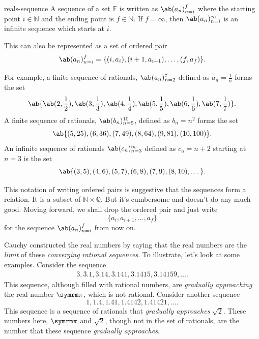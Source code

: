 \begin{notation}{}{reals-sequence}
  A sequence of a set $\mathbb{F}$ is written as $\sequence{a_n}{n = i}{f}$ where the
  starting point $i \in \mathbb{N}$ and the ending point is $f \in \mathbb{N}$. If
  $f = \infty$, then $\sequence{a_n}{n = i}{\infty}$ is an infinite sequence which starts at $i$.

  This can also be represented as a set of ordered pair
  \begin{equation}
    \sequence{a_n}{n = i}{f} = \{(i, a_i), (i + 1, a_{i+1}), \dots, (f, a_{f})\}.
  \end{equation}
\end{notation}

For example, a finite sequence of rationals, $\sequence{a_n}{n = 2}{7}$ defined as
$a_n = \frac{1}{n}$ forms the set
\begin{equation*}
  \ab\{\ab(2, \frac{1}{2}), \ab(3, \frac{1}{3}), \ab(4, \frac{1}{4}), \ab(5, \frac{1}{5}), \ab(6, \frac{1}{6}), \ab(7, \frac{1}{7})\}.
\end{equation*}
A finite sequence of rationals, $\sequence{b_n}{n = 5}{10}$, defined as $b_n = n^2$ forms the set
\begin{equation*}
  \ab\{(5, 25), (6, 36), (7, 49), (8, 64), (9, 81), (10, 100)\}.
\end{equation*}
An infinite sequence of rationals $\sequence{c_n}{n = 3}{\infty}$ defined as $c_n = n + 2$
starting at $n = 3$ is the set
\begin{equation*}
  \ab\{(3, 5), (4, 6), (5, 7), (6, 8), (7, 9), (8, 10), \dots\}.
\end{equation*}

This notation of writing ordered pairs is suggestive that the sequences form a relation.
It is a subset of \(\mathbb{N} \times \mathbb{Q}\). But it's cumbersome and doesn't do
any much good. Moving forward, we shall drop the ordered pair and just write
\begin{equation}
  \{a_i, a_{i+1}, \dots, a_f\}
\end{equation}
for the sequence \(\sequence{a_n}{n = i}{f}\) from now on.

Cauchy constructed the real numbers by saying that the real numbers are the \emph{limit}
of these \emph{converging rational sequences}. To illustrate, let's look at some
examples. Consider the sequence
\begin{gather*}
  3, 3.1, 3.14, 3.141, 3.1415, 3.14159, \dots.
\end{gather*}
This sequence, although filled with rational numbers, are \emph{gradually approaching}
the real number $\cpi$, which is not rational. Consider another sequence
\begin{equation}
  1, 1.4, 1.41, 1.4142, 1.41421, \dots.
\end{equation}
This sequence is a sequence of rationals that \emph{gradually approaches} $\sqrt{2}$.
These numbers here, $\cpi$ and $\sqrt{2}$, though not in the set of rationals, are the
number that these sequence \emph{gradually approaches}.

